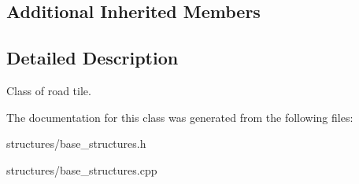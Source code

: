 \subsection*{Additional Inherited Members}


\subsection{Detailed Description}
Class of road tile. 

The documentation for this class was generated from the following files\+:\begin{DoxyCompactItemize}
\item 
structures/base\+\_\+structures.\+h\item 
structures/base\+\_\+structures.\+cpp\end{DoxyCompactItemize}
